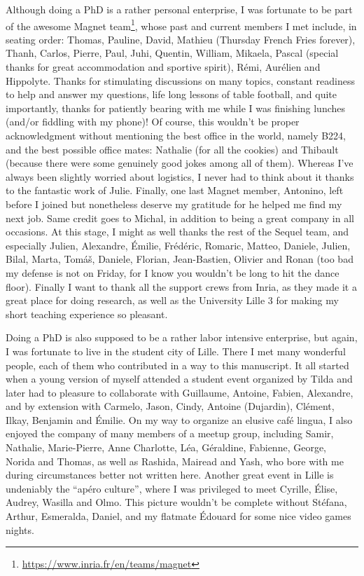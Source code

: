 Although doing a PhD is a rather personal enterprise, I was fortunate to be
part of the awesome Magnet
team\footnote{\url{https://www.inria.fr/en/teams/magnet}}, whose past and
current members I met include, in seating order: Thomas, Pauline, David,
Mathieu (Thursday French Fries forever), Thanh, Carlos, Pierre, Paul, Juhi,
Quentin, William, Mikaela, Pascal (special thanks for great accommodation and
sportive spirit), Rémi, Aurélien and Hippolyte. Thanks for stimulating
discussions on many topics, constant readiness to help and answer my questions,
life long lessons of table football, and quite importantly, thanks for
patiently bearing with me while I was finishing lunches (and/or fiddling with
my phone)! Of course, this wouldn't be proper acknowledgment without
mentioning the best office in the world, namely B224, and the best possible
office mates: Nathalie (for all the cookies) and Thibault (because there were
some genuinely good jokes among all of them). Whereas I've always been slightly
worried about logistics, I never had to think about it thanks to the fantastic
work of Julie. Finally, one last Magnet member, Antonino, left before I joined
but nonetheless deserve my gratitude for he helped me find my next job. Same
credit goes to Michal, in addition to being a great company in all occasions.
At this stage, I might as well thanks the rest of the Sequel team, and
especially Julien, Alexandre, Émilie, Frédéric, Romaric, Matteo, Daniele,
Julien, Bilal, Marta, Tomáš,
Daniele, Florian, Jean-Bastien, Olivier and Ronan (too bad my defense is not on Friday, for I know
you wouldn't be long to hit the dance floor). Finally I want to thank all the
support crews from Inria, as they made it a great place for doing research, as
well as the University Lille 3 for making my short teaching experience so
pleasant.

\medskip

Doing a PhD is also supposed to be a rather labor intensive enterprise, but
again, I was fortunate to live in the student city of Lille. There I met many
wonderful people, each of them who contributed in a way to this manuscript. It
all started when a young version of myself attended a student event organized
by Tilda and later had to pleasure to collaborate with Guillaume, Antoine,
Fabien, Alexandre, and by extension with Carmelo, Jason, Cindy, Antoine
(Dujardin), Clément, Ilkay, Benjamin and Émilie. On my way to organize an
elusive café lingua, I also enjoyed the company of many members of a meetup
group, including Samir, Nathalie, Marie-Pierre, Anne Charlotte, Léa, Géraldine,
Fabienne, George, Norida and Thomas, as well as Rashida, Mairead and Yash, who
bore with me during circumstances better not written here. Another great
event in Lille is undeniably the \enquote{apéro culture}, where I was
privileged to meet Cyrille, Élise, Audrey, Wasilla and Olmo. This picture
wouldn't be complete without Stéfana, Arthur, Esmeralda, Daniel, and my
flatmate Édouard for some nice video games nights.

